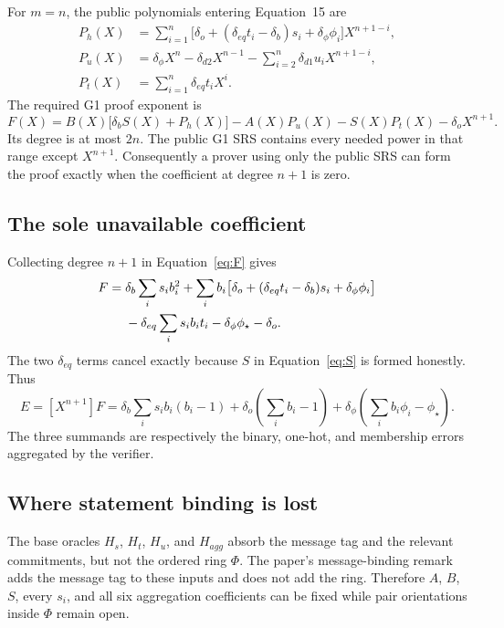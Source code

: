 \documentclass[10pt,a4paper]{article}
\begin{document}
For $m=n$, the public polynomials entering Equation~15 are
\begin{align}
P_h(X)&=\sum_{i=1}^{n}
 \bigl[\delta_o+(\delta_{eq}t_i-\delta_b)s_i
       +\delta_\phi\phi_i\bigr]X^{n+1-i},\label{eq:ph}\\
P_u(X)&=\delta_\phi X^n-\delta_{d2}X^{n-1}
 -\sum_{i=2}^{n}\delta_{d1}u_iX^{n+1-i},\label{eq:pu}\\
P_t(X)&=\sum_{i=1}^{n}\delta_{eq}t_iX^i.\label{eq:pt}
\end{align}
The required G1 proof exponent is
\begin{equation}\label{eq:F}
F(X)=B(X)\bigl[\delta_bS(X)+P_h(X)\bigr]
     -A(X)P_u(X)-S(X)P_t(X)-\delta_oX^{n+1}.
\end{equation}
Its degree is at most $2n$. The public G1 SRS contains every needed power in
that range except $X^{n+1}$. Consequently a prover using only the public SRS
can form the proof exactly when the coefficient at degree $n+1$ is zero.

\subsection{The sole unavailable coefficient}

Collecting degree $n+1$ in Equation~\eqref{eq:F} gives
\begin{align}
[X^{n+1}]F
={}&\delta_b\sum_i s_i b_i^2
 +\sum_i b_i\bigl[\delta_o+(\delta_{eq}t_i-\delta_b)s_i
                         +\delta_\phi\phi_i\bigr]\notag\\
&-\delta_{eq}\sum_i s_i b_i t_i
 -\delta_\phi\phi_\star-\delta_o.\label{eq:expanded}
\end{align}
The two $\delta_{eq}$ terms cancel exactly because $S$ in
Equation~\eqref{eq:S} is formed honestly. Thus
\begin{equation}\label{eq:missing}
E=[X^{n+1}]F
=\delta_b\sum_i s_i b_i(b_i-1)
 +\delta_o\left(\sum_i b_i-1\right)
 +\delta_\phi\left(\sum_i b_i\phi_i-\phi_\star\right).
\end{equation}
The three summands are respectively the binary, one-hot, and membership
errors aggregated by the verifier.

\subsection{Where statement binding is lost}

The base oracles $H_s$, $H_t$, $H_u$, and $H_{agg}$ absorb the message tag
and the relevant commitments, but not the ordered ring $\Phi$. The paper's
message-binding remark adds the message tag to these inputs and does not add
the ring. Therefore $A$, $B$, $S$, every $s_i$, and all six aggregation
coefficients can be fixed while pair orientations inside $\Phi$ remain open.
\end{document}
